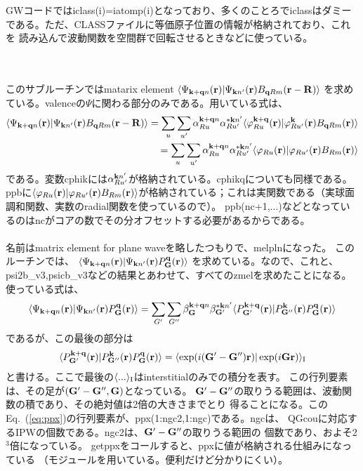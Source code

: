 \documentclass[a4paper,10pt,aip,onecolumn,amsmath,amssymb,floatfix,rmp]{revtex4-1}
\newcommand{\bfq}{{\bf q}}
\newcommand{\bfk}{{\bf k}}
\newcommand{\bfr}{{\bf r}}
\newcommand{\bfG}{{\bf G}}
\newcommand{\bfR}{{\bf R}}
\newcommand{\req}[1]{\mbox{Eq.~\!(\ref{#1})}}
\def\Psikqn{{\Psi_{{\bf k}+{\bf q} n}}}
\begin{document}
GWコードではiclass(i)=iatomp(i)となっており、多くのことろでiclassはダミー
である。ただ、CLASSファイルに等価原子位置の情報が格納されており、これを
読み込んで波動関数を空間群で回転させるときなどに使っている。

　\\

 \\
このサブルーチンではmatarix element 
$\langle\Psikqn(\bfr)| \Psi_{\bfk n'}(\bfr) B_{\bfq Rm}(\bfr-\bfR) \rangle$
を求めている。valenceの$\Psi$に関わる部分のみである。用いている式は、
\begin{eqnarray}
\langle\Psikqn(\bfr)| \Psi_{\bfk n'}(\bfr) B_{\bfq Rm}(\bfr-\bfR) \rangle
= \sum_{u} \sum_{u'} \alpha^{\bfk+\bfq n}_{Ru} \alpha^{* \bfk n'}_{Ru'}
\langle \varphi^{\bf k+q}_{Ru}(\bfr)|\varphi^{\bf k}_{Ru'}(\bfr) B_{\bfq
Rm}(\bfr) \rangle \nonumber \\
=
\sum_{u} \sum_{u'} \alpha^{\bfk+\bfq n}_{Ru} \alpha^{* \bfk n'}_{Ru'}
\langle \varphi_{Ru}(\bfr)|\varphi_{Ru'}(\bfr) B_{Rm}(\bfr) \rangle
\end{eqnarray}
である。変数cphikには$\alpha^{\bfk n'}_{Ru'}$が格納されている。cphikqについても同様である。
ppbに$\langle \varphi_{Ru}(\bfr)|\varphi_{Ru'}(\bfr)
B_{Rm}(\bfr)\rangle$が格納されている；これは実関数である（実球面調和関数、実数のradial関数を使っているので）。
ppb(nc+1,...)などとなっているのはncがコアの数でその分オフセットする必要があるからである。\\


\\
名前はmatrix element for plane waveを略したつもりで、melplnになった。
このルーチンでは、
$\langle\Psikqn(\bfr)| \Psi_{\bfk n'}(\bfr) P^{\bf q}_{\bf G}({\bf r}) \rangle$
を求めている。なので、これと、psi2b\_v3,psicb\_v3などの結果とあわせて、すべてのzmelを求めたことになる。
使っている式は、
\begin{eqnarray}
\langle\Psikqn(\bfr)| \Psi_{\bfk n'}(\bfr) P^{\bf q}_{\bf G}(\bfr) \rangle
= \sum_{G'} \sum_{G''} \beta^{\bfk+\bfq n}_{\bfG} \beta^{* \bfk n'}_{\bfG'}
\langle P^{\bf k+q}_{\bf G'}(\bfr)| P^{\bf k}_{\bf G''}(\bfr) 
P^{\bf q}_{\bf G}({\bf r}) \rangle \label{eq:ppip} 
\end{eqnarray}
であるが、この最後の部分は
\begin{eqnarray}
\langle P^{\bf k+q}_{\bf G'}(\bfr)| P^{\bf k}_{\bf G''}(\bfr) 
P^{\bf q}_{\bf G}({\bf r})\rangle
=\langle \exp(i (\bfG'- \bfG'')\bfr) |\exp(i \bfG\bfr)\rangle_{\rm I}
\label{eq:ppx}
\end{eqnarray}
と書ける。ここで最後の$\langle ... \rangle_{\rm I}$はinterstitialのみでの積分を表す。
この行列要素は、その足が$(\bfG'- \bfG'', \bfG)$となっている。
$\bfG'- \bfG''$の取りうる範囲は、波動関数の積であり、その絶対値は2倍の大きさまでとり
得ることになる。この\req{eq:ppx}の行列要素が、ppx(1:ngc2,1:ngc)である。ngcは、
QGcouに対応するIPWの個数である。ngc2は、$\bfG'- \bfG''$の取りうる範囲の
個数であり、およそ2$^3$倍になっている。
getppxをコールすると、ppxに値が格納される仕組みになっている
（モジュールを用いている。便利だけど分かりにくい）。
\end{document}

